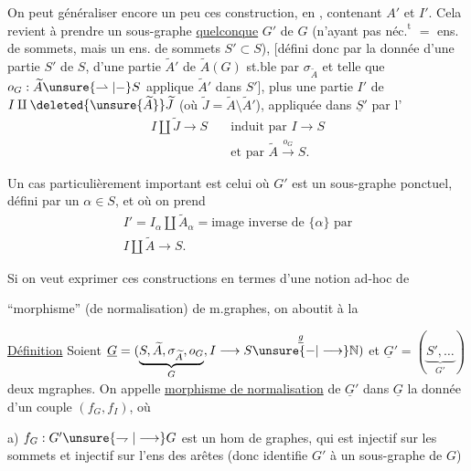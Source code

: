 On peut généraliser encore un peu ces construction, en    , contenant $A'$ et $I'$. Cela revient à prendre un sous-graphe \uline{quelconque} $G'$ de $G$ (n'ayant pas $\text{néc.}^{\text{t}}$  $=$ ens. de sommets, mais un ens. de sommets $S'\subset S$), [défini donc par la donnée d'une partie $S'$ de $S$, d'une partie $\widetilde A'$ de $\widetilde A(G)$ st.ble par $\sigma_{\widetilde A}$ et telle que $o_G:\widetilde A\unsure{\rightharpoonup|{-}}S$ applique $\widetilde A'$ dans $S'$], plus une partie $I'$ de $I\amalg\deleted{\unsure{\widetilde A}}\widetilde J$ (où $\widetilde J=\widetilde A\setminus\widetilde A'$), appliquée dans $\underline{S}'$ par l'
\[
\begin{aligned}
I\amalg\widetilde J\longrightarrow S\quad &\text{induit par }I\longrightarrow S\\
&\text{et par }\widetilde A\xrightarrow{o_G}S.
\end{aligned}
\]

Un cas particulièrement important est celui où $G'$ est un sous-graphe ponctuel, défini par un $\alpha\in S$,  et où on prend
\[
\begin{gathered}
I'=I_\alpha\amalg\widetilde A_\alpha=\text{image inverse de }\{\alpha\}\text{ par}\\
I\amalg\widetilde A\longrightarrow S.
\end{gathered}
\]

Si on veut exprimer ces constructions en termes d'une notion ad-hoc de

``morphisme'' (de normalisation) de m.graphes, on aboutit à la

\uline{Définition} Soient $\underline G=(\underbrace{S,\widetilde A,\sigma_{\widetilde A},o_G}_{G},I\longrightarrow S\overset{\underline g}{\unsure{-|\longrightarrow}}\mathbb N)$ et $\underline G'=(\underbrace{S',\ldots}_{G'})$ deux mgraphes. On appelle \uline{morphisme de normalisation} de $\underline G'$ dans $\underline G$ la donnée d'un couple  $(f_G,f_I)$, où

a) $f_G:G'\unsure{\rightharpoondown|\longrightarrow}G$ est un hom de graphes, qui est injectif sur les sommets et injectif sur l'ens des arêtes (donc identifie $G'$ à un sous-graphe de $G$)

